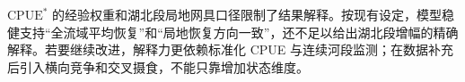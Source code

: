 $\mathrm{CPUE}^*$ 的经验权重和湖北段局地网具口径限制了结果解释。按现有设定，模型稳健支持“全流域平均恢复”和“局地恢复方向一致”，还不足以给出湖北段增幅的精确解释。若要继续改进，解释力更依赖标准化 CPUE 与连续河段监测；在数据补充后引入横向竞争和交叉摄食，不能只靠增加状态维度。
